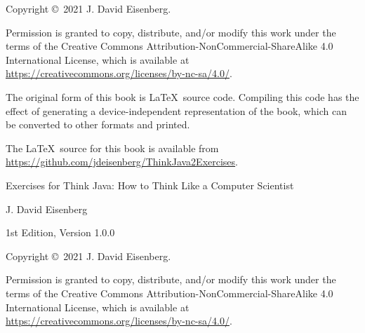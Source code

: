 \documentclass[12pt]{book}
\newcommand{\thetitle}{Exercises for Think Java}
\newcommand{\thesubtitle}{How to Think Like a Computer Scientist}
\newcommand{\theauthors}{J. David Eisenberg}
\newcommand{\theversion}{1st Edition, Version 1.0.0}
\theoremstyle{exercise}
\begin{document}
\begin{latexonly}
\newpage
\thispagestyle{empty}

Copyright \copyright ~2021 \theauthors.

\vspace{0.2in}


Permission is granted to copy, distribute, and/or modify this work under the terms of the Creative Commons Attribution-NonCommercial-ShareAlike 4.0 International License, which is available at \url{https://creativecommons.org/licenses/by-nc-sa/4.0/}.

The original form of this book is \LaTeX\ source code.
Compiling this code has the effect of generating a device-independent representation of the book, which can be converted to other formats and printed.

The \LaTeX\ source for this book is available from \url{https://github.com/jdeisenberg/ThinkJava2Exercises}.


\cleardoublepage
\setcounter{tocdepth}{1}
\tableofcontents

\end{latexonly}


\begin{htmlonly}

\vspace{1em}

{\Large \thetitle: \thesubtitle}

{\large \theauthors}

\theversion

\vspace{1em}

Copyright \copyright ~2021 \theauthors.

Permission is granted to copy, distribute, and/or modify this work under the terms of the Creative Commons Attribution-NonCommercial-ShareAlike 4.0 International License, which is available at \url{https://creativecommons.org/licenses/by-nc-sa/4.0/}.

\vspace{1em}

\end{htmlonly}
\end{document}
